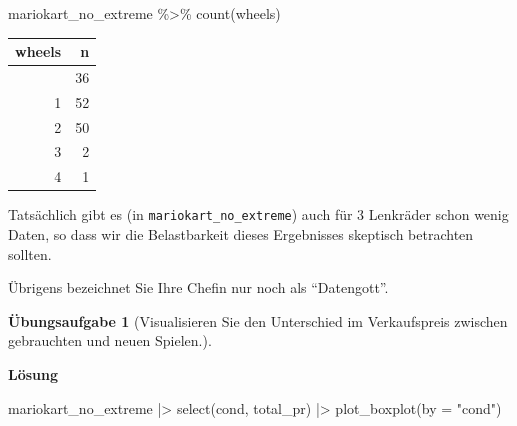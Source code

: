 \documentclass[
  letterpaper,
]{scrbook}
\newenvironment{Shaded}{\begin{snugshade}}{\end{snugshade}}
\newcommand{\AttributeTok}[1]{\textcolor[rgb]{0.40,0.45,0.13}{#1}}
\newcommand{\FunctionTok}[1]{\textcolor[rgb]{0.28,0.35,0.67}{#1}}
\newcommand{\NormalTok}[1]{\textcolor[rgb]{0.00,0.23,0.31}{#1}}
\newcommand{\SpecialCharTok}[1]{\textcolor[rgb]{0.37,0.37,0.37}{#1}}
\newcommand{\StringTok}[1]{\textcolor[rgb]{0.13,0.47,0.30}{#1}}
\theoremstyle{definition}
\theoremstyle{definition}
\theoremstyle{definition}
\newtheorem{exercise}{Übungsaufgabe}[chapter]
\theoremstyle{remark}
\begin{document}
\begin{Shaded}
\begin{Highlighting}[]
\NormalTok{mariokart\_no\_extreme }\SpecialCharTok{\%\textgreater{}\%} 
  \FunctionTok{count}\NormalTok{(wheels)}
\end{Highlighting}
\end{Shaded}

\begin{longtable}[]{@{}rr@{}}
\toprule\noalign{}
wheels & n \\
\midrule\noalign{}
\endhead
\bottomrule\noalign{}
\endlastfoot
0 & 36 \\
1 & 52 \\
2 & 50 \\
3 & 2 \\
4 & 1 \\
\end{longtable}

Tatsächlich gibt es (in \texttt{mariokart\_no\_extreme}) auch für 3
Lenkräder schon wenig Daten, so dass wir die Belastbarkeit dieses
Ergebnisses skeptisch betrachten sollten.

Übrigens bezeichnet Sie Ihre Chefin nur noch als ``Datengott''.

\begin{exercise}[Visualisieren Sie den Unterschied im Verkaufspreis
zwischen gebrauchten und neuen
Spielen.]\protect\hypertarget{exr-diff-plot}{}\label{exr-diff-plot}

\textbf{Lösung}

\begin{Shaded}
\begin{Highlighting}[]
\NormalTok{mariokart\_no\_extreme }\SpecialCharTok{|\textgreater{}} 
  \FunctionTok{select}\NormalTok{(cond, total\_pr) }\SpecialCharTok{|\textgreater{}} 
  \FunctionTok{plot\_boxplot}\NormalTok{(}\AttributeTok{by =} \StringTok{"cond"}\NormalTok{)}
\end{Highlighting}
\end{Shaded}

\end{exercise}
\end{document}
